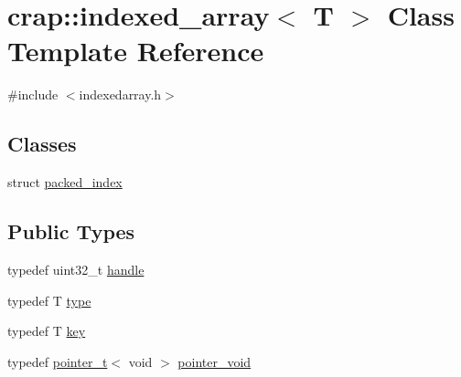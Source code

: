 \hypertarget{classcrap_1_1indexed__array}{\section{crap\+:\+:indexed\+\_\+array$<$ T $>$ Class Template Reference}
\label{classcrap_1_1indexed__array}
}


{\ttfamily \#include $<$indexedarray.\+h$>$}

\subsection*{Classes}
\begin{DoxyCompactItemize}
\item 
struct \hyperlink{structcrap_1_1indexed__array_1_1packed__index}{packed\+\_\+index}
\end{DoxyCompactItemize}
\subsection*{Public Types}
\begin{DoxyCompactItemize}
\item 
typedef uint32\+\_\+t \hyperlink{classcrap_1_1indexed__array_a2bf08c14ec39108ed7bdd9b570dc55ba}{handle}
\item 
typedef T \hyperlink{classcrap_1_1indexed__array_a30710c6c57a6a6fbe151809b415c856e}{type}
\item 
typedef T \hyperlink{classcrap_1_1indexed__array_afdc964d76a19bb2f302fe43fefa5b5f3}{key}
\item 
typedef \hyperlink{structcrap_1_1pointer__t}{pointer\+\_\+t}$<$ void $>$ \hyperlink{classcrap_1_1indexed__array_a8590198c1f75bc14843f09c491a446e9}{pointer\+\_\+void}
\end{DoxyCompactItemize}
